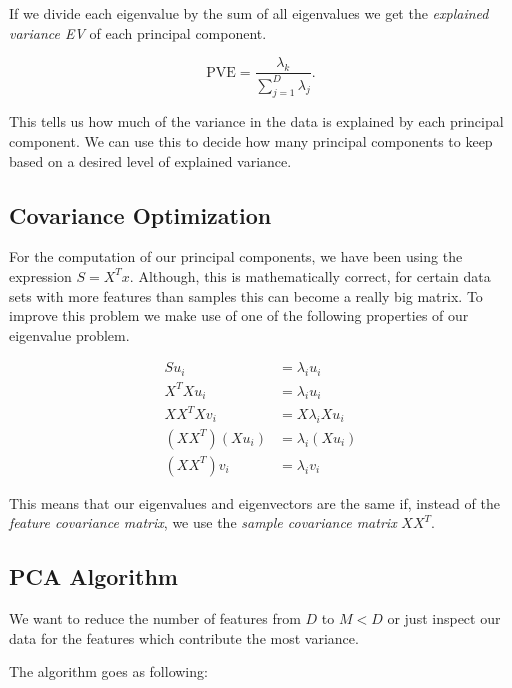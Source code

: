 If we divide each eigenvalue by the sum of all eigenvalues we get the \emph{explained variance EV} of each principal component.

\[
	\mathrm{PVE} = \frac{\lambda_k}{\sum_{j = 1}^{D} \lambda_j}.
\]

This tells us how much of the variance in the data is explained by each principal component. We can use this to decide how many principal components to
keep based on a desired level of explained variance.

\subsection{Covariance Optimization}

For the computation of our principal components, we have been using the expression \(S = X^Tx\). Although, this
is mathematically correct, for certain data sets with more features than samples this can become a really big matrix. To improve
this problem we make use of one of the following properties of our eigenvalue problem.

\begin{align*}
	S u _i         & = \lambda_i u_i      \\
	X^T X u_i      & = \lambda_i u_i      \\
	X X^T X v_i    & = X \lambda_i X u_i  \\
	(X X^T)(X u_i) & =  \lambda_i (X u_i) \\
	(X X^T)v_i     & =  \lambda_i v_i
\end{align*}

This means that our eigenvalues and eigenvectors are the same if, instead of the \emph{feature covariance matrix}, we use the \emph{sample covariance matrix} \(XX^T\).

\subsection{PCA Algorithm}

We want to reduce the number of features from \(D\) to \(M < D\) or just inspect our data for the features which contribute the most
variance.

The algorithm goes as following:

